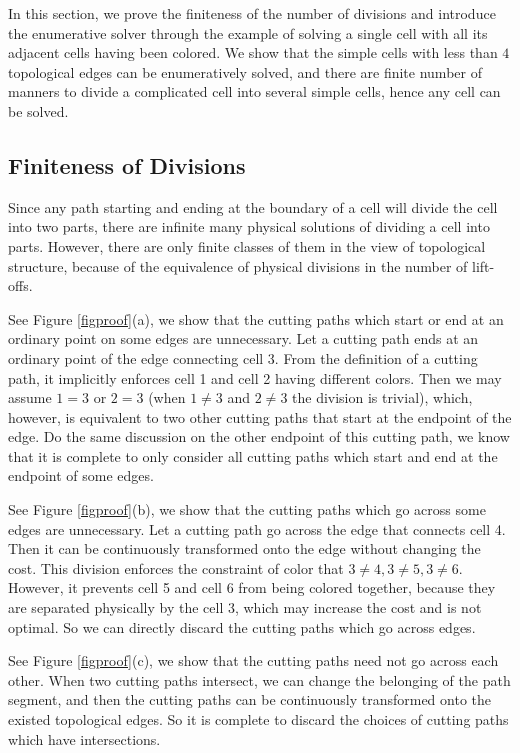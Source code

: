 \documentclass[journal]{IEEEtran}
\begin{document}
In this section, we prove the finiteness of the number of divisions and introduce the enumerative solver through the example of solving a single cell with all its adjacent cells having been colored. We show that the simple cells with less than $4$ topological edges can be enumeratively solved, and there are finite number of manners to divide a complicated cell into several simple cells, hence any cell can be solved. 

\subsection{Finiteness of Divisions}\label{subsectionproof}
Since any path starting and ending at the boundary of a cell will divide the cell into two parts, there are infinite many physical solutions of dividing a cell into parts. However, there are only finite classes of them in the view of topological structure, because of the equivalence of physical divisions in the number of lift-offs. 

See Figure \ref{figproof}(a), we show that the cutting paths which start or end at an ordinary point on some edges are unnecessary. 
Let a cutting path ends at an ordinary point of the edge connecting cell 3. From the definition of a cutting path, it implicitly enforces cell 1 and cell 2 having different colors. Then we may assume $1=3$ or $2=3$ (when $1\neq 3$ and $2\neq 3$ the division is trivial), which, however, is equivalent to two other cutting paths that start at the endpoint of the edge. Do the same discussion on the other endpoint of this cutting path, we know that it is complete to only consider all cutting paths which start and end at the endpoint of some edges.  


See Figure \ref{figproof}(b), we show that the cutting paths which go across some edges are unnecessary. Let a cutting path go across the edge that connects cell 4. 
Then it can be continuously transformed onto the edge without changing the cost. 
This division enforces the constraint of color that $3\neq 4, 3\neq 5, 3\neq 6$. However, it prevents cell 5 and cell 6 from being colored together, because they are separated physically by the cell 3, which may increase the cost and is not optimal. So we can directly discard the cutting paths which go across edges. 

See Figure \ref{figproof}(c), we show that the cutting paths need not go across each other. When two cutting paths intersect, we can change the belonging of the path segment, and then the cutting paths can be continuously transformed onto the existed topological edges. So it is complete to discard the choices of cutting paths which have intersections. 
\end{document}
